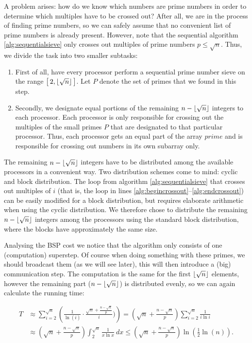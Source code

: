 \documentclass{article}
\DeclarePairedDelimiter\floor{\lfloor}{\rfloor}
\begin{document}
A problem arises: how do we know which numbers are prime numbers in order to determine which multiples have to be crossed out? After all, we are in the process of finding prime numbers, so we can safely assume that no convenient list of prime numbers is already present. However, note that the sequential algorithm \ref{alg:sequentialsieve} only crosses out multiples of prime numbers $p \leq \sqrt{n}$. Thus, we divide the task into two smaller subtasks:
\begin{enumerate}
	\item First of all, have every processor perform a sequential prime number sieve on the range $\big[\,2,\floor{\sqrt{n}}\,\big]$. Let $P$ denote the set of primes that we found in this step.
	
	\item Secondly, we designate equal portions of the remaining $n - \floor{\sqrt{n}}$ integers to each processor. Each processor is only responsible for crossing out the multiples of the small primes $P$ that are designated to that particular processor. Thus, each processor gets an equal part of the array $prime$ and is responsible for crossing out numbers in its own subarray only.
\end{enumerate}
The remaining $n - \floor{\sqrt{n}}$ integers have to be distributed among the available processors in a convenient way. Two distribution schemes come to mind: cyclic and block distribution. The loop from algorithm \ref{alg:sequentialsieve} that crosses out multiples of $i$ (that is, the loop in lines \ref{alg:begincrossout}--\ref{alg:endcrossout}) can be easily modified for a block distribution, but requires elaborate arithmetic when using the cyclic distribution. We therefore chose to distribute the remaining $n -\floor{\sqrt{n}}$ integers among the processors using the standard block distribution, where the blocks have approximately the same size.

Analysing the BSP cost we notice that the algorithm only consists of one (computation) superstep. Of course when doing something with these primes, we should broadcast them (as we will see later), this will then introduce a (big) communication step. The computation is the same for the first $\floor{\sqrt{n}}$ elements, however the remaining part ($n - \floor{\sqrt{n}}$) is distributed evenly, so we can again calculate the running time:

\begin{align*}
	T &\approx \sum_{i=2}^{\sqrt{n}} \left(\frac{1}{\ln(i)} \cdot \frac{\sqrt{n} + \frac{n - \sqrt{n}}{p}}{i}) \right)
	= (\sqrt{n} + \tfrac{n-\sqrt{n}}{p})\sum_{i=2}^{\sqrt{n}} \frac{1}{i\ln i} \\
	& \approx (\sqrt{n} + \tfrac{n-\sqrt{n}}{p})\int_2^{\sqrt{n}} \frac{1}{x\ln x} \:dx
	\leq (\sqrt{n} + \tfrac{n-\sqrt{n}}{p})\ln\left(\tfrac{1}{2}\ln(n)\right).
\end{align*}
\end{document}
